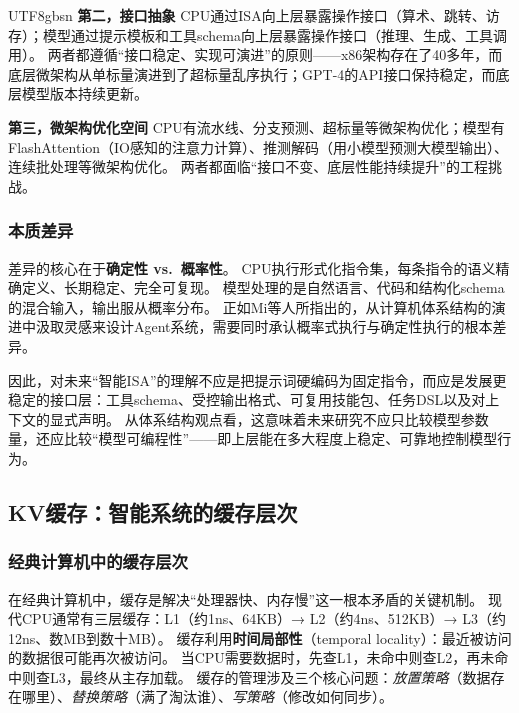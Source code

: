 \documentclass[11pt,a4paper]{article}
\begin{document}
\begin{CJK*}{UTF8}{gbsn}
\textbf{第二，接口抽象}
CPU通过ISA向上层暴露操作接口（算术、跳转、访存）；模型通过提示模板和工具schema向上层暴露操作接口（推理、生成、工具调用）。
两者都遵循``接口稳定、实现可演进''的原则——x86架构存在了40多年，而底层微架构从单标量演进到了超标量乱序执行；GPT-4的API接口保持稳定，而底层模型版本持续更新。

\textbf{第三，微架构优化空间}
CPU有流水线、分支预测、超标量等微架构优化；模型有FlashAttention（IO感知的注意力计算\cite{dao2022flashattention}）、推测解码（用小模型预测大模型输出\cite{leviathan2023speculative}）、连续批处理等微架构优化。
两者都面临``接口不变、底层性能持续提升''的工程挑战。

\subsubsection{本质差异}

差异的核心在于\textbf{确定性 vs.\ 概率性}。
CPU执行形式化指令集，每条指令的语义精确定义、长期稳定、完全可复现。
模型处理的是自然语言、代码和结构化schema的混合输入，输出服从概率分布。
正如Mi等人所指出的，从计算机体系结构的演进中汲取灵感来设计Agent系统，需要同时承认概率式执行与确定性执行的根本差异\cite{mi2025llmagentscomputersystems}。

因此，对未来``智能ISA''的理解不应是把提示词硬编码为固定指令，而应是发展更稳定的接口层：工具schema、受控输出格式、可复用技能包、任务DSL以及对上下文的显式声明。
从体系结构观点看，这意味着未来研究不应只比较模型参数量，还应比较``模型可编程性''——即上层能在多大程度上稳定、可靠地控制模型行为。

\subsection{KV缓存：智能系统的缓存层次}
\label{sec:kv}

\subsubsection{经典计算机中的缓存层次}

在经典计算机中，缓存是解决``处理器快、内存慢''这一根本矛盾的关键机制\cite{drepper2007memory}。
现代CPU通常有三层缓存：L1（约1ns、64KB）→ L2（约4ns、512KB）→ L3（约12ns、数MB到数十MB）。
缓存利用\textbf{时间局部性}（temporal locality）：最近被访问的数据很可能再次被访问。
当CPU需要数据时，先查L1，未命中则查L2，再未命中则查L3，最终从主存加载。
缓存的管理涉及三个核心问题：\textit{放置策略}（数据存在哪里）、\textit{替换策略}（满了淘汰谁）、\textit{写策略}（修改如何同步）。


\end{CJK*}
\end{document}

